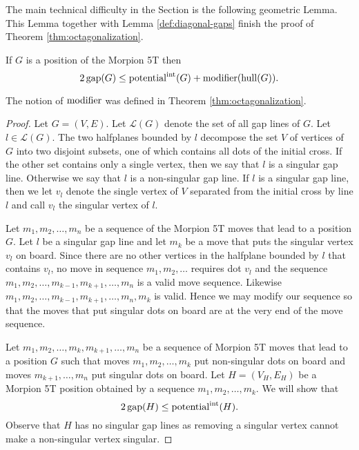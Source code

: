 \noindent

The main technical difficulty in the Section is the following geometric Lemma. This Lemma together with Lemma \ref{def:diagonal-gaps} finish the proof of Theorem \ref{thm:octagonalization}.
\begin{lemma}
\label{lem:morpion_graphs}
If $G$ is a position of the Morpion 5T then \[ 2\operatorname{gap}(G) \leq \operatorname{potential}^{\operatorname{int}}(G)+\operatorname{modifier}(\operatorname{hull}(G)). \]
\end{lemma}
The notion of $\operatorname{modifier}$ was defined in Theorem \ref{thm:octagonalization}.


\begin{proof}
Let $G = (V, E)$. Let $\mathcal{L}(G)$ denote the set of all gap lines of $G$. Let $l \in \mathcal{L}(G)$. The two halfplanes bounded by $l$ decompose the set $V$ of vertices of $G$ into two disjoint subsets, one of which contains all dots of the initial cross. If the other set contains only a single vertex, then we say that $l$ is a singular gap line. Otherwise we say that $l$ is a non-singular gap line. If $l$ is a singular gap line, then we let $v_l$ denote the single vertex of $V$ separated from the initial cross by line $l$ and call $v_l$ the singular vertex of $l$.


\noindent
   \begin{minipage}[l]{0.45\textwidth}
	
   \end{minipage}%
   \hfill
   \begin{minipage}[r]{0.5\textwidth} 
Let $m_1, m_2, \ldots, m_n$ be a sequence of the Morpion 5T moves that lead to a position $G$. Let $l$ be a singular gap line and let $m_k$ be a move that puts the singular vertex $v_l$ on board. Since there are no other vertices in the halfplane bounded by $l$ that contains $v_l$, no move in sequence $m_1, m_2, \ldots$ requires dot $v_l$ and the sequence $m_1, m_2, \ldots, m_{k-1}, m_{k+1}, \ldots, m_n$ is a valid move sequence. Likewise $m_1, m_2, \ldots, m_{k-1}, m_{k+1}, \ldots, m_n, m_k$ is valid.
Hence we may modify our sequence so that the moves that put singular dots on board are at the very end of the move sequence.
   \end{minipage}


Let $m_1, m_2, \ldots, m_k, m_{k+1}, \ldots, m_n$ be a sequence of Morpion 5T moves that lead to a position $G$ such that moves $m_1, m_2, \ldots, m_k$ put non-singular dots on board and moves $m_{k+1}, \ldots, m_n$ put singular dots on board.
Let $H = (V_H, E_H)$ be a Morpion 5T position obtained by a sequence $m_1, m_2, \ldots, m_k$. We will show that
\[
2\operatorname{gap}(H) \leq \operatorname{potential}^{\operatorname{int}}(H).
\]
Observe that $H$ has no singular gap lines as removing a singular vertex cannot make a non-singular vertex singular.


\end{proof}
